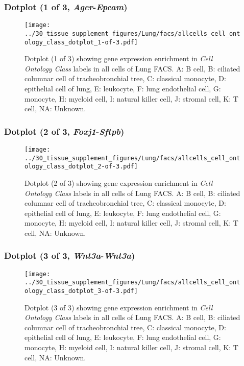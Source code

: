 \clearpage

\subsubsection{Dotplot (1 of 3, \emph{Ager}-\emph{Epcam})}
\begin{figure}[h]
\centering
\texttt{[image: ../30\_tissue\_supplement\_figures/Lung/facs/allcells\_cell\_ontology\_class\_dotplot\_1-of-3.pdf]}

\caption{ Dotplot (1 of 3)  showing gene expression enrichment in \emph{Cell Ontology Class} labels in all cells of Lung FACS. A: B cell, B: ciliated columnar cell of tracheobronchial tree, C: classical monocyte, D: epithelial cell of lung, E: leukocyte, F: lung endothelial cell, G: monocyte, H: myeloid cell, I: natural killer cell, J: stromal cell, K: T cell, NA: Unknown.}
\end{figure}


\clearpage

\subsubsection{Dotplot (2 of 3, \emph{Foxj1}-\emph{Sftpb})}
\begin{figure}[h]
\centering
\texttt{[image: ../30\_tissue\_supplement\_figures/Lung/facs/allcells\_cell\_ontology\_class\_dotplot\_2-of-3.pdf]}

\caption{ Dotplot (2 of 3)  showing gene expression enrichment in \emph{Cell Ontology Class} labels in all cells of Lung FACS. A: B cell, B: ciliated columnar cell of tracheobronchial tree, C: classical monocyte, D: epithelial cell of lung, E: leukocyte, F: lung endothelial cell, G: monocyte, H: myeloid cell, I: natural killer cell, J: stromal cell, K: T cell, NA: Unknown.}
\end{figure}


\clearpage

\subsubsection{Dotplot (3 of 3, \emph{Wnt3a}-\emph{Wnt3a})}
\begin{figure}[h]
\centering
\texttt{[image: ../30\_tissue\_supplement\_figures/Lung/facs/allcells\_cell\_ontology\_class\_dotplot\_3-of-3.pdf]}

\caption{ Dotplot (3 of 3)  showing gene expression enrichment in \emph{Cell Ontology Class} labels in all cells of Lung FACS. A: B cell, B: ciliated columnar cell of tracheobronchial tree, C: classical monocyte, D: epithelial cell of lung, E: leukocyte, F: lung endothelial cell, G: monocyte, H: myeloid cell, I: natural killer cell, J: stromal cell, K: T cell, NA: Unknown.}
\end{figure}



